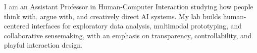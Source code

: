 %
%
%

\vspace{-2.5\baselineskip}

I am an Assistant Professor in Human-Computer Interaction studying how people think with, argue with, and creatively direct AI systems.
My lab builds human-centered interfaces for exploratory data analysis, multimodal prototyping, and collaborative sensemaking, with an emphasis on transparency, controllability, and playful interaction design.

\vspace{-.5\baselineskip}